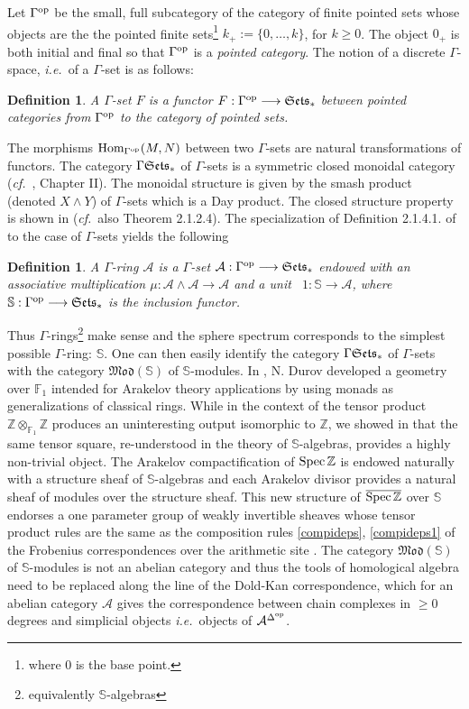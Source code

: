 \documentclass[12pt]{article}
\newtheorem{defn}[thm]{Definition}
\def\Hom{{\rm Hom}}
\def\Spec{{\rm Spec\,}}
\def\F{{\mathbb F}}
\def\Z{{\mathbb Z}}
\def\gam{{\Gamma\Ses}}
\def\cA{{\mathcal A}}
\newcommand{\ie}{{\it i.e.\/}\ }
\newcommand{\cf}{{\it cf.}}
\def\Hom {{\mbox{Hom}}}
\def\catmo{{\mathfrak{Mod}}}
\def\sss{{\mathbb  S}}
\def\gop{{\Gamma^{\rm op}}}
\def\Se{\frak{ Sets}}
\def\dop{{\Delta^{\rm op}}}
\def\Ses{{\Se_*}}
\begin{document}
  Let $\Gamma^{\rm op}$ be  the small, full subcategory  of the category of finite pointed sets whose objects are the the pointed finite sets\footnote{where $0$ is the base point.} $k_+:=\{0,\ldots ,k\}$, for $k\geq 0$.  The object $0_+$ is both initial and final so that $\gop$ is a  {\em pointed category}. The notion  of a discrete $\Gamma$-space, \ie of a $\Gamma$-set  is as follows:
\begin{defn}\label{defngamset} A $\Gamma$-set $F$ is a  functor $F:\gop\longrightarrow\Ses$ between pointed categories from $\gop$ to the category of pointed sets. \end{defn}
The morphisms $\Hom_\gop(M,N)$ between two $\Gamma$-sets are natural transformations of functors. 
The category $\gam$ of $\Gamma$-sets is a symmetric closed monoidal category (\cf~\cite{DGM}, Chapter II).  The monoidal structure is given by the smash product (denoted $X\wedge Y$) of $\Gamma$-sets which is a Day product. The closed structure property is shown in \cite{Lyd} (\cf~also \cite{DGM} Theorem 2.1.2.4). The specialization of Definition 2.1.4.1. of \cite{DGM} to the case of $\Gamma$-sets yields the following
\begin{defn}\label{defnsalg} A $\Gamma$-ring $\mathcal A$  is a $\Gamma$-set $\mathcal A: \gop\longrightarrow\Ses$  endowed with an associative multiplication 
$\mu:\cA \wedge \cA\to \cA$ and a unit~ $1: \sss\to \cA$, where  
$
\sss:\gop\longrightarrow \Ses
$
is the inclusion  functor.
\end{defn}
 Thus $\Gamma$-rings\footnote{equivalently $\sss$-algebras} make sense and the sphere spectrum corresponds to the simplest possible $\Gamma$-ring:  $\sss$. One can then easily identify the category $\gam$ of $\Gamma$-sets with the category $\catmo(\sss)$ of $\sss$-modules. 
In \cite{Durov}, N. Durov developed a geometry over $\F_1$ intended for Arakelov theory applications by using  monads as  generalizations of classical rings. 
While in the context of  \cite{Durov} the tensor product $\Z\otimes_{\F_1} \Z$ produces an uninteresting output isomorphic to $\Z$,  we showed in \cite{CCsalg}  that the same tensor square, re-understood in the theory of $\sss$-algebras, provides a highly non-trivial object. 
The Arakelov compactification of $\Spec\Z$ is endowed naturally with a structure sheaf of $\sss$-algebras and each Arakelov divisor provides a natural sheaf of modules over the structure sheaf. This new structure of $\overline{\Spec\Z}$ over $\sss$ endorses a one parameter group of weakly invertible sheaves whose tensor product rules are the same as   the composition rules \eqref{compideps}, \eqref{compideps1} of the Frobenius correspondences over
the arithmetic site \cite{CC, CCas1}.    The category $\catmo(\sss)$ of $\sss$-modules is not an abelian category and thus the tools of homological algebra need to be replaced along the line of the Dold-Kan correspondence, which for an abelian category $\cA$ gives the correspondence between chain complexes in $\geq 0$ degrees and simplicial objects \ie objects of $\cA^\dop$. 
\end{document}

